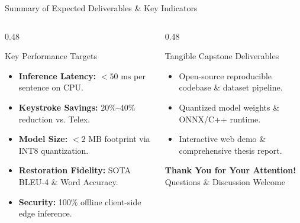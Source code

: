 \documentclass[aspectratio=169,10pt]{beamer}
\begin{document}
\begin{frame}{Summary of Expected Deliverables \& Key Indicators}
  \begin{columns}[T]
    \begin{column}{0.48\textwidth}
      \begin{block}{Key Performance Targets}
        \begin{itemize}\setlength{\itemsep}{3pt}\footnotesize
          \item \textbf{Inference Latency:} $< 50\text{ ms}$ per sentence on CPU.
          \item \textbf{Keystroke Savings:} $20\%$--$40\%$ reduction vs. Telex.
          \item \textbf{Model Size:} $< 2\text{ MB}$ footprint via INT8 quantization.
          \item \textbf{Restoration Fidelity:} SOTA BLEU-4 \& Word Accuracy.
          \item \textbf{Security:} 100\% offline client-side edge inference.
        \end{itemize}
      \end{block}
    \end{column}

    \begin{column}{0.48\textwidth}
      \begin{exampleblock}{Tangible Capstone Deliverables}
        \begin{itemize}\setlength{\itemsep}{3pt}\footnotesize
          \item Open-source reproducible codebase \& dataset pipeline.
          \item Quantized model weights \& ONNX/C++ runtime.
          \item Interactive web demo \& comprehensive thesis report.
        \end{itemize}
      \end{exampleblock}
      \vspace{0.3cm}
      \begin{center}
        {\large\textbf{Thank You for Your Attention!}}\\[0.15cm]
        {\small Questions \& Discussion Welcome}
      \end{center}
    \end{column}
  \end{columns}
\end{frame}
\end{document}
